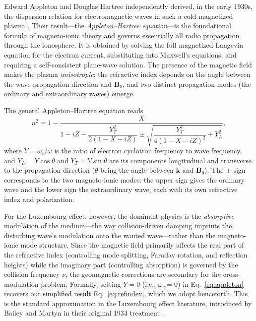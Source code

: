 \documentclass[12pt]{article}
\begin{document}
Edward Appleton and Douglas Hartree independently derived, in the early 1930s, the
dispersion relation for electromagnetic waves in such a cold magnetized plasma
\cite{appleton1932,hartree1931}.  Their result---the \emph{Appleton--Hartree equation}---is
the foundational formula of magneto-ionic theory and governs essentially all radio
propagation through the ionosphere.  It is obtained by solving the full magnetized Langevin
equation for the electron current, substituting into Maxwell's equations, and requiring a
self-consistent plane-wave solution.  The presence of the magnetic field makes the plasma
\emph{anisotropic}: the refractive index depends on the angle between the wave propagation
direction and $\mathbf{B}_0$, and two distinct propagation modes (the ordinary and
extraordinary waves) emerge.

The general Appleton--Hartree equation reads
\begin{equation}
  n^2 = 1 - \frac{X}{1 - iZ
    - \dfrac{Y_T^2}{2(1-X-iZ)}
    \pm \sqrt{\dfrac{Y_T^4}{4(1-X-iZ)^2} + Y_L^2}},
  \label{eq:appleton}
\end{equation}
where $Y = \omega_c/\omega$ is the ratio of electron cyclotron frequency to wave frequency,
and $Y_L = Y\cos\theta$ and $Y_T = Y\sin\theta$ are its components longitudinal and
transverse to the propagation direction ($\theta$ being the angle between $\mathbf{k}$ and
$\mathbf{B}_0$).  The $\pm$ sign corresponds to the two magneto-ionic modes: the upper sign
gives the ordinary wave and the lower sign the extraordinary wave, each with its own
refractive index and polarization.

For the Luxembourg effect, however, the dominant physics is the \emph{absorptive}
modulation of the medium---the way collision-driven damping imprints the disturbing wave's
modulation onto the wanted wave---rather than the magneto-ionic mode structure.  Since the
magnetic field primarily affects the real part of the refractive index (controlling mode
splitting, Faraday rotation, and reflection heights) while the imaginary part (controlling
absorption) is governed by the collision frequency $\nu$, the geomagnetic corrections are
secondary for the cross-modulation problem.  Formally, setting $Y = 0$ (i.e., $\omega_c =
0$) in Eq.~\eqref{eq:appleton} recovers our simplified result Eq.~\eqref{eq:refindex},
which we adopt henceforth.  This is the standard approximation in the Luxembourg effect
literature, introduced by Bailey and Martyn in their original 1934 treatment
\cite{bailey1934philmag}.
\end{document}
